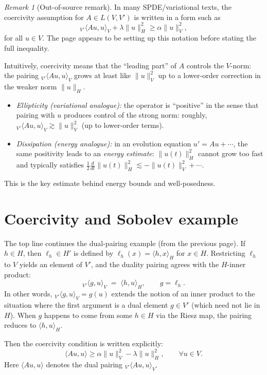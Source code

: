 \documentclass[11pt]{article}
\theoremstyle{definition}
\theoremstyle{remark}
\newtheorem{remark}{Remark}
\begin{document}
\begin{remark}[Out-of-source remark]
In many SPDE/variational texts, the coercivity assumption for $A\in L(V,V')$ is written in a form such as
\[
{}_{V'}\langle Au,u\rangle_V + \lambda \|u\|_H^2 \ge \alpha \|u\|_V^2,
\]
for all $u\in V$. The page appears to be setting up this notation before stating the full inequality.

Intuitively, coercivity means that the ``leading part'' of $A$ controls the $V$-norm: the pairing ${}_{V'}\langle Au,u\rangle_V$ grows at least like $\|u\|_V^2$ up to a lower-order correction in the weaker norm $\|u\|_H$.
\begin{itemize}
\item \emph{Ellipticity (variational analogue):} the operator is ``positive'' in the sense that pairing with $u$ produces control of the strong norm: roughly, ${}_{V'}\langle Au,u\rangle_V\gtrsim \|u\|_V^2$ (up to lower-order terms).
\item \emph{Dissipation (energy analogue):} in an evolution equation $u'=Au+\cdots$, the same positivity leads to an \emph{energy estimate}: $\|u(t)\|_H^2$ cannot grow too fast and typically satisfies $\frac12\frac{d}{dt}\|u(t)\|_H^2 \lesssim -\|u(t)\|_V^2+\cdots$.
\end{itemize}
This is the key estimate behind energy bounds and well-posedness.
\end{remark}

\section*{Coercivity and Sobolev example}

The top line continues the dual-pairing example (from the previous page). If $h\in H$, then $\ell_h\in H'$ is defined by $\ell_h(x)=\langle h,x\rangle_H$ for $x\in H$. Restricting $\ell_h$ to $V$ yields an element of $V'$, and the duality pairing agrees with the $H$-inner product:
\[
{}_{V'}\langle g,u\rangle_V
\;=\;
\langle h,u\rangle_H,
\qquad g=\ell_h.
\]
In other words, ${}_{V'}\langle g,u\rangle_V=g(u)$ extends the notion of an inner product to the situation where the first argument is a dual element $g\in V'$ (which need not lie in $H$). When $g$ happens to come from some $h\in H$ via the Riesz map, the pairing reduces to $\langle h,u\rangle_H$.

Then the coercivity condition is written explicitly:
\[
\langle Au,u\rangle
\ge
\alpha \|u\|_V^2 - \lambda \|u\|_H^2,
\qquad \forall u\in V.
\]
Here $\langle Au,u\rangle$ denotes the dual pairing ${}_{V'}\langle Au,u\rangle_V$.
\end{document}
